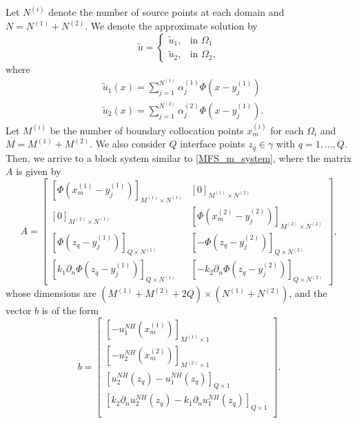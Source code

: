 \documentclass[5p,authoryear]{elsarticle}
\begin{document}
Let \(N^{(i)}\) denote the number of source points at each domain and \(N=N^{(1)}+N^{(2)}\). We denote the approximate solution by
\[
    \tilde{u} = \begin{cases}
        \tilde{u}_1, & \text{in } \Omega_1\\
        \tilde{u}_2, & \text{in } \Omega_2,
    \end{cases}
\]
where
\begin{align*}
    &\tilde{u}_1(x) = \sum_{j=1}^{N^{(1)}} \alpha^{(1)}_j \Phi\left(x-y_j^{(1)}\right)\\
    &\tilde{u}_2(x) = \sum_{j=1}^{N^{(2)}} \alpha^{(2)}_j \Phi\left(x-y_j^{(1)}\right).
\end{align*}
Let \(M^{(i)}\) be the number of boundary collocation points \(x^{(i)}_{m}\) for each \(\Omega_i\) and \(M=M^{(1)}+M^{(2)}\). We also consider \(Q\) interface points \(z_q \in \gamma\) with \(q=1,\dots,Q\). Then, we arrive to a block system similar to \eqref{MFS_m_system}, where the matrix \(A\) is given by
\footnotesize\begin{equation*}
    A = \begin{bmatrix}
        \left[\Phi\left(x^{(1)}_{m}-y_j^{(1)}\right)\right]_{M^{(1)}\times N^{(1)}} & [0]_{M^{(1)}\times N^{(2)}} \\
        [0]_{M^{(2)}\times N^{(1)}} & \left[\Phi\left(x^{(2)}_{m}-y_j^{(2)}\right)\right]_{M^{(2)}\times N^{(2)}} \\
        \left[\Phi\left(z_q-y_j^{(1)}\right)\right]_{Q\times N^{(1)}} & \left[-\Phi\left(z_q-y_j^{(2)}\right)\right]_{Q\times N^{(2)}} \\
        \left[k_1\partial_n \Phi\left(z_q-y_j^{(1)}\right)\right]_{Q\times N^{(1)}} & \left[-k_2 \partial_n \Phi\left(z_q-y_j^{(2)}\right)\right]_{Q\times N^{(2)}}
    \end{bmatrix},
\end{equation*}\normalsize
whose dimensions are \((M^{(1)}+M^{(2)}+2Q)\times(N^{(1)}+N^{(2)})\), and the vector \(b\) is of the form
\footnotesize \begin{equation*}
        b = \begin{bmatrix}
        \left[-u_1^{NH}(x^{(1)}_{m})\right]_{M^{(1)}\times 1}\\
        \left[-u_2^{NH}(x^{(2)}_{m})\right]_{M^{(2)}\times 1}\\
        \left[u_2^{NH}(z_q)-u_1^{NH}(z_q)\right]_{Q\times 1}\\
        \left[k_2 \partial_n u_2^{NH}(z_q)- k_1 \partial_n u_1^{NH}(z_q)\right]_{Q\times 1}\\
    \end{bmatrix}.
\end{equation*}\normalsize
\end{document}
